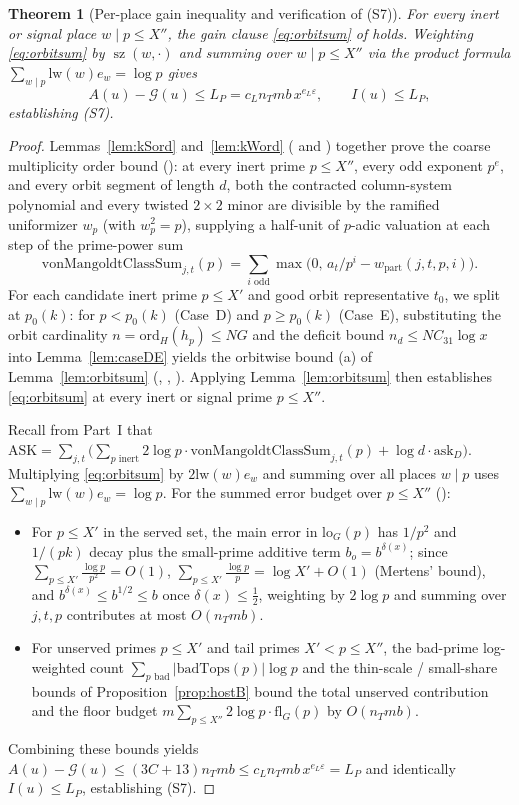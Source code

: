 \documentclass[11pt]{amsart}
\newcommand{\eps}{\varepsilon}
\newcommand{\ASK}{\mathrm{ASK}}
\DeclareMathOperator{\sz}{sz}
\theoremstyle{plain}
\newtheorem{theorem}{Theorem}[section]
\theoremstyle{definition}
\numberwithin{equation}{section}
\begin{document}
\begin{theorem}[Per-place gain inequality and verification of (S7)]\label{thm:S7}
For every inert or signal place $w\mid p\le X''$, the gain clause \eqref{eq:orbitsum} of
 holds. Weighting \eqref{eq:orbitsum} by $\sz(w,\cdot)$ and summing over
$w\mid p\le X''$ via the product formula $\sum_{w\mid p}\mathrm{lw}(w)e_w=\log p$ gives
\[
A(u)-\mathcal G(u)\le L_P=c_L n_T m b\,x^{e_L\eps},\qquad I(u)\le L_P,
\]
establishing \textup{(S7)}.
\end{theorem}

\begin{proof}
Lemmas~\ref{lem:kSord} and~\ref{lem:kWord} ( and ) together prove the
coarse multiplicity order bound (): at every inert prime $p\le X''$, every odd
exponent $p^e$, and every orbit segment of length $d$, both the contracted column-system
polynomial and every twisted $2\times 2$ minor are divisible by the ramified uniformizer $w_p$
(with $w_p^2=p$), supplying a half-unit of $p$-adic valuation at each step of the prime-power sum
\[
\mathrm{vonMangoldtClassSum}_{j,t}(p)=\sum_{i\text{ odd}}\max\bigl(0,\,a_t/p^i-w_{\mathrm{part}}(j,t,p,i)\bigr).
\]
For each candidate inert prime $p\le X'$ and good orbit representative $t_0$, we split at
$p_0(k)$: for $p<p_0(k)$ (Case~D) and $p\ge p_0(k)$ (Case~E), substituting the orbit cardinality
$n=\mathrm{ord}_H(h_p)\le N G$ and the deficit bound $n_d\le N C_{31}\log x$ into
Lemma~\ref{lem:caseDE} yields the orbitwise bound (a) of Lemma~\ref{lem:orbitsum} (,
, ). Applying Lemma~\ref{lem:orbitsum} then establishes
\eqref{eq:orbitsum} at every inert or signal prime $p\le X''$.

Recall from Part~I that
$\ASK=\sum_{j,t}\bigl(\sum_{p\text{ inert}}2\log p\cdot\mathrm{vonMangoldtClassSum}_{j,t}(p)
+\log d\cdot\mathrm{ask}_D\bigr)$.
Multiplying \eqref{eq:orbitsum} by $2\mathrm{lw}(w)e_w$ and summing over all places $w\mid p$
uses $\sum_{w\mid p}\mathrm{lw}(w)e_w=\log p$. For the summed error budget over $p\le X''$
():
\begin{itemize}
\item For $p\le X'$ in the served set, the main error in $\mathrm{lo}_G(p)$ has $1/p^2$ and
  $1/(pk)$ decay plus the small-prime additive term $b_o=b^{\delta(x)}$; since
  $\sum_{p\le X'}\frac{\log p}{p^2}=O(1)$, $\sum_{p\le X'}\frac{\log p}{p}=\log X'+O(1)$
  (Mertens' bound), and $b^{\delta(x)}\le b^{1/2}\le b$ once $\delta(x)\le\frac12$, weighting by
  $2\log p$ and summing over $j,t,p$ contributes at most $O(n_T m b)$.
\item For unserved primes $p\le X'$ and tail primes $X'<p\le X''$, the bad-prime log-weighted
  count $\sum_{p\text{ bad}}|\mathrm{badTops}(p)|\log p$ and the thin-scale / small-share bounds
  of Proposition~\ref{prop:hostB} bound the total unserved contribution and the floor budget
  $m\sum_{p\le X''}2\log p\cdot\mathrm{fl}_G(p)$ by $O(n_T m b)$.
\end{itemize}
Combining these bounds yields $A(u)-\mathcal G(u)\le (3C+13)n_T m b\le c_L n_T m b\,x^{e_L\eps}=L_P$
and identically $I(u)\le L_P$, establishing \textup{(S7)}.
\end{proof}
\end{document}
